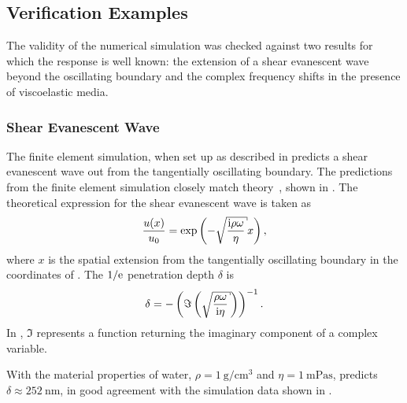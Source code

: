 \subsection{Verification Examples}
The validity of the numerical simulation was checked against two results
for which the response is well known: the extension of a shear evanescent
wave beyond the oscillating boundary and the complex frequency shifts in
the presence of viscoelastic media.

\subsubsection{Shear Evanescent Wave}
The finite element simulation, when set up as described in
 predicts a shear evanescent wave out from
the tangentially oscillating boundary.  The predictions from the finite
element simulation closely match theory~\cite{steinem2007piezoelectric},
shown in .  The theoretical expression for the
shear evanescent wave is taken as~\cite{steinem2007piezoelectric}
\begin{equation}
 \frac{u(x)}{u_0} = \exp\left(-\sqrt{\frac{\mi \rho \omega}{\eta}} x\right),
\end{equation}
where $x$ is the spatial extension from the tangentially oscillating
boundary in the coordinates of .  The $1/{\mathrm{e}}$
penetration depth $\delta$ is
\begin{equation}
 \delta =
 -\left(\Im\left(\sqrt{\frac{\rho\omega}{\mi\eta}}\right)\right)^{-1}.
 \label{eqn:suppshearwavedelta}
\end{equation}
In , $\Im$ represents a function returning
the imaginary component of a complex variable.

With the material properties of water,
$\rho=\SI{1}{\gram\per\centi\meter\cubed}$ and
$\eta=\SI{1}{\milli\pascal\second}$, 
predicts $\delta\approx\SI{252}{\nano\meter}$, in good agreement with the
simulation data shown in .


